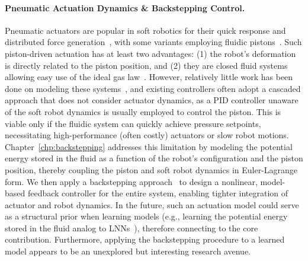 \paragraph{Pneumatic Actuation Dynamics \& Backstepping Control.}
Pneumatic actuators are popular in soft robotics for their quick response and distributed force generation~\citep{marchese2015recipe, zaidi2021actuation}, with some variants employing fluidic pistons~\citep{marchese2014design, marchese2016design, parlikar2024concept, malas2024novel}. Such piston-driven actuation has at least two advantages: (1) the robot’s deformation is directly related to the piston position, and (2) they are closed fluid systems allowing easy use of the ideal gas law~\citep{marchese2016design}. However, relatively little work has been done on modeling these systems~\citep{marchese2014design, xavier2020modelling}, and existing controllers often adopt a cascaded approach that does not consider actuator dynamics, as a PID controller unaware of the soft robot dynamics is usually employed to control the piston. This is viable only if the fluidic system can quickly achieve pressure setpoints, necessitating high-performance (often costly) actuators or slow robot motions.
%
Chapter~\ref{chp:backstepping} addresses this limitation by modeling the potential energy stored in the fluid as a function of the robot’s configuration and the piston position, thereby coupling the piston and soft robot dynamics in Euler-Lagrange form. We then apply a backstepping approach~\citep{kokotovic1992joy, lozano1992adaptive, khalil2002nonlinear} to design a nonlinear, model-based feedback controller for the entire system, enabling tighter integration of actuator and robot dynamics.
In the future, such an actuation model could serve as a structural prior when learning models (e.g., learning the potential energy stored in the fluid analog to \glspl{LNN}~\citep{lutter2019deep}), therefore connecting to the core contribution. Furthermore, applying the backstepping procedure to a learned model appears to be an unexplored but interesting research avenue.


